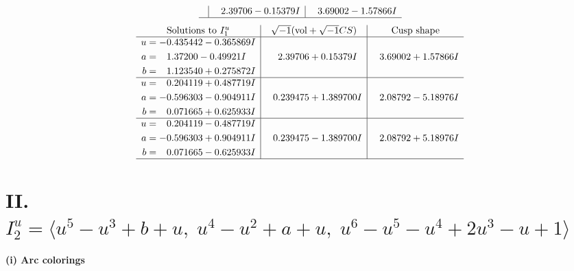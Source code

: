 \documentclass[1p]{elsarticle_modified}
\theoremstyle{definition}
\newcommand{\I}{\sqrt{-1}}
\begin{document}
$$\begin{array}{c|c|c}
 & \phantom{-}2.39706 - 0.15379 I & \phantom{-}3.69002 - 1.57866 I\\
 \hline 
 \end{array}$$\newpage$$\begin{array}{c|c|c}  
\text{Solutions to }I^u_{1}& \I (\text{vol} + \sqrt{-1}CS) & \text{Cusp shape}\\
 \hline 
\begin{aligned}
u &= -0.435442 - 0.365869 I \\
a &= \phantom{-}1.37200 - 0.49921 I \\
b &= \phantom{-}1.123540 + 0.275872 I\end{aligned}
 & \phantom{-}2.39706 + 0.15379 I & \phantom{-}3.69002 + 1.57866 I \\ \hline\begin{aligned}
u &= \phantom{-}0.204119 + 0.487719 I \\
a &= -0.596303 - 0.904911 I \\
b &= \phantom{-}0.071665 + 0.625933 I\end{aligned}
 & \phantom{-}0.239475 + 1.389700 I & \phantom{-}2.08792 - 5.18976 I \\ \hline\begin{aligned}
u &= \phantom{-}0.204119 - 0.487719 I \\
a &= -0.596303 + 0.904911 I \\
b &= \phantom{-}0.071665 - 0.625933 I\end{aligned}
 & \phantom{-}0.239475 - 1.389700 I & \phantom{-}2.08792 + 5.18976 I\\
 \hline 
 \end{array}$$\newpage\newpage\renewcommand{\arraystretch}{1}
\centering \section*{II. $I^u_{2}= \langle u^5- u^3+b+u,\;u^4- u^2+a+u,\;u^6- u^5- u^4+2 u^3- u+1 \rangle$}
\flushleft \textbf{(i) Arc colorings}\\
\end{document}
